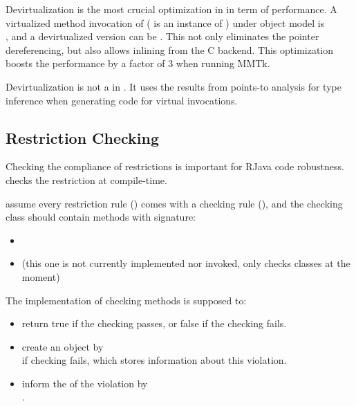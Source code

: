 \documentclass[12pt]{article}
\begin{document}
Devirtualization is the most crucial optimization in \rjc in term of performance. 
A virtualized method invocation of  
( is an instance of ) under \rjc object model is \\
,
and a devirtualized version can be . 
This not only eliminates the pointer dereferencing, but also allows inlining
from the C backend. This optimization boosts the performance by a factor of 3
when running MMTk. 

Devirtualization is not a  in \rjc. It uses the results
from points-to analysis for type inference when generating code for virtual invocations. 

\subsection{Restriction Checking}

Checking the compliance of restrictions is important for RJava code robustness. 
\rjc checks the restriction at compile-time. 

\rjc assume every restriction rule ()
comes with a checking rule (),
and the checking class should contain methods with signature:
\begin{itemize}
\item {}
\item {} 
(this one is not currently implemented nor invoked, \rjc only checks classes at the moment)
\end{itemize}

The implementation of checking methods is supposed to:
\begin{itemize}
\item return true if the checking passes, or false if the checking fails. 
\item create an  object by \\
if checking fails, which stores information about this violation. 
\item inform the  of the violation by\\
. 
\end{itemize}
\end{document}

